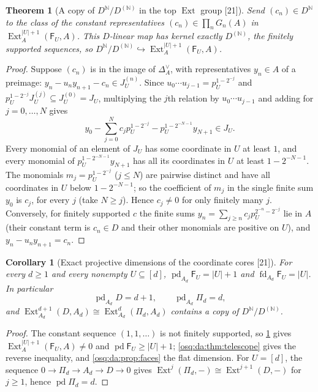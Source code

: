 \documentclass[11pt,letterpaper]{article}
\numberwithin{equation}{section}
\newtheorem{theorem}{Theorem}[section]
\newtheorem{corollary}[corollary]{Corollary}
\theoremstyle{definition}
\theoremstyle{remark}
\theoremstyle{plain}
\newcommand{\N}{\mathbb N}
\newcommand{\Ext}{\operatorname{Ext}}
\newcommand{\pd}{\operatorname{pd}}
\newcommand{\fd}{\operatorname{fd}}
\newcommand{\src}[1]{\textup{\textsf{[#1]}}}
\begin{document}
\begin{theorem}[A copy of $D^{\N}/D^{(\N)}$ in the top $\Ext$ group \src{21}]\label{osq:da:thm:injection}
Send $(c_n)\in D^{\N}$ to the class of the constant representatives $(c_n)\in\prod_nG_n(A)$ in $\Ext^{|U|+1}_A(\mathsf F_U,A)$. This
$D$-linear map has kernel exactly $D^{(\N)}$, the finitely supported sequences, so
$D^{\N}/D^{(\N)}\hookrightarrow\Ext^{|U|+1}_A(\mathsf F_U,A)$.
\end{theorem}
\begin{proof}
Suppose $(c_n)$ is in the image of $\Delta^\vee_A$, with representatives $y_n\in A$ of a preimage: $y_n-u_ny_{n+1}-c_n\in J^{(n)}_U$. Since
$u_0\cdots u_{j-1}=p_U^{1-2^{-j}}$ and $p_U^{1-2^{-j}}J^{(j)}_U\subseteq J^{(0)}_U=J_U$, multiplying the $j$th relation by $u_0\cdots u_{j-1}$
and adding for $j=0,\dots,N$ gives
\[
 y_0-\sum_{j=0}^Nc_jp_U^{1-2^{-j}}-p_U^{1-2^{-N-1}}y_{N+1}\in J_U .
\]
Every monomial of an element of $J_U$ has some coordinate in $U$ at least $1$, and every monomial of $p_U^{1-2^{-N-1}}y_{N+1}$ has all its
coordinates in $U$ at least $1-2^{-N-1}$. The monomials $m_j=p_U^{1-2^{-j}}$ ($j\le N$) are pairwise distinct and have all coordinates in $U$
below $1-2^{-N-1}$; so the coefficient of $m_j$ in the single finite sum $y_0$ is $c_j$, for every $j$ (take $N\ge j$). Hence $c_j\ne0$ for
only finitely many $j$. Conversely, for finitely supported $c$ the finite sums $y_n=\sum_{j\ge n}c_jp_U^{2^{-n}-2^{-j}}$ lie in $A$ (their
constant term is $c_n\in D$ and their other monomials are positive on $U$), and $y_n-u_ny_{n+1}=c_n$.
\end{proof}

\begin{corollary}[Exact projective dimensions of the coordinate cores \src{21}]\label{osq:da:cor:exactpd}
For every $d\ge1$ and every nonempty $U\subseteq[d]$, $\pd_{A_d}\mathsf F_U=|U|+1$ and $\fd_{A_d}\mathsf F_U=|U|$. In particular
\[
 \pd_{A_d}D=d+1,\qquad \pd_{A_d}\Pi_d=d,
\]
and $\Ext^{d+1}_{A_d}(D,A_d)\cong\Ext^d_{A_d}(\Pi_d,A_d)$ contains a copy of $D^{\N}/D^{(\N)}$.
\end{corollary}
\begin{proof}
The constant sequence $(1,1,\dots)$ is not finitely supported, so \cref{osq:da:thm:injection} gives $\Ext^{|U|+1}_A(\mathsf F_U,A)\ne0$ and
$\pd\mathsf F_U\ge|U|+1$; \cref{osq:da:thm:telescope} gives the reverse inequality, and \cref{osq:da:prop:faces} the flat dimension. For
$U=[d]$, the sequence $0\to\Pi_d\to A_d\to D\to0$ gives $\Ext^j(\Pi_d,-)\cong\Ext^{j+1}(D,-)$ for $j\ge1$, hence $\pd\Pi_d=d$.
\end{proof}
\end{document}
